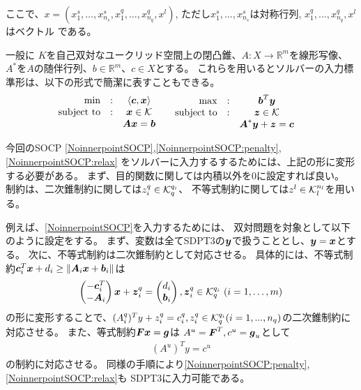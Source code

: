 \documentclass[11pt,a4paper,dvipdfmx,titlepage,uplatex]{jsarticle}
\theoremstyle{mystyle}
\newcommand{\modify}[2]{\begin{color}{red}\underline{#1}{#2}\end{color}}
\newcommand{\0}{\mathbf{0}}
\def\b{\mbox{\boldmath $b$}}
\def\c{\mbox{\boldmath $c$}}
\def\g{\mbox{\boldmath $g$}}
\def\x{\mbox{\boldmath $x$}}
\def\y{\mbox{\boldmath $y$}}
\def\z{\mbox{\boldmath $z$}}
\def\A{\mbox{\boldmath $A$}}
\def\F{\mbox{\boldmath $F$}}
\def\KC{\mbox{$\cal K$}}
\def\Real{\mbox{$\mathbb{R}$}}
\begin{document}
ここで、$x = (x_1^s , \dots , x_{n_s}^s , x_1^q , \dots , x_{n_q}^q , x^l)$,
ただし$x_1^s , \dots , x_{n_s}^s$は対称行列,
$x_1^q , \dots , x_{n_q}^q , x^l$はベクトル
である。

一般に
$K$を自己双対なユークリッド空間上の閉凸錐、$A:X \to \Real^m$を線形写像、
$A^*$を$A$の随伴行列、$b \in \Real^m$、$c \in X$とする。
これらを用いるとソルバーの入力標準形は、以下の形式で簡潔に表すこともできる。
\begin{align}
	\label{eq:SDPT3-input}
  \begin{array}{rcc}
    \min & : & \langle \c , \x \rangle \\
    \text{subject to} & : & \x \in \KC \\
    & & \A \x = \b
  \end{array} & \quad
  \begin{array}{rcc}
    \max & : & \b^T \y \\
    \text{subject to} & : & \z \in \KC \\
    & & \A^* \y + \z = \c
  \end{array}
\end{align}

今回のSOCP
\eqref{NoinnerpointSOCP},\eqref{NoinnerpointSOCP:penalty},\eqref{NoinnerpointSOCP:relax}
をソルバーに入力するするためには、上記の形に変形する必要がある。
まず、目的関数に関しては内積以外を$0$に設定すれば良い。
制約は、二次錐制約に関しては$z_i^q \in \KC_q^{q_i}$、
不等式制約に関しては$z^l \in \KC_l^{n_l}$を用いる。%

例えば、\eqref{NoinnerpointSOCP}を入力するためには、
双対問題を対象として以下のように設定をする。
まず、変数は全てSDPT3の$\y$で扱うこととし、$\y = \x$とする。
次に、不等式制約は二次錐制約として対応させる。
具体的には、不等式制約$\c_i^T \x + d_i \ge \|\A_i \x + \b_i\|$は
\begin{align}
  \begin{pmatrix}
    - \c_i^T \\
    - \A_i \\
  \end{pmatrix}
  \x + \z_i^q =
  \begin{pmatrix}
    d_i \\
    \b_i \\
  \end{pmatrix} , \z_i^q \in \KC_q^{q_i} \ (i = 1 , \dots , m)
\end{align}
の形に変形することで、$(A_i^q)^T y + z_i^q = c_i^q, z_i^q \in \KC_q^{q_i} (i = 1,...,n_q)$の二次錐制約に対応させる。
また、等式制約$\F \x = \g$は
$A^u = \F^T , c^u = \g_u$として
\begin{align}
  (A^u)^T y = c^u
\end{align}
の制約に対応させる。
同様の手順により\eqref{NoinnerpointSOCP:penalty},\eqref{NoinnerpointSOCP:relax}も
SDPT3に入力可能である。
\end{document}

